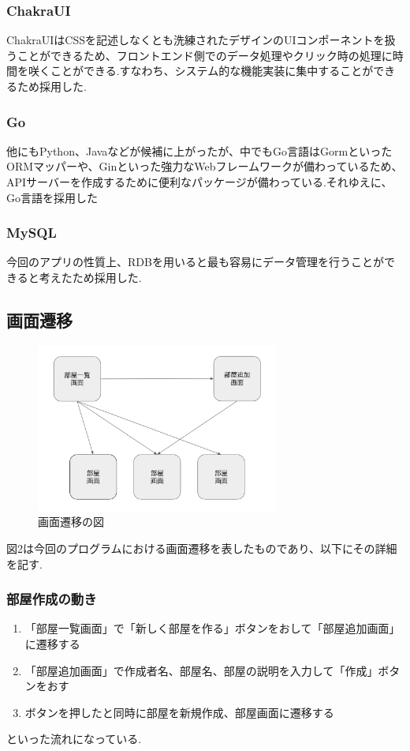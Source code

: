 \documentclass[submit,techrep]{ipsj}
\begin{document}
\subsubsection{ChakraUI}
ChakraUIはCSSを記述しなくとも洗練されたデザインのUIコンポーネントを扱うことができるため、フロントエンド側でのデータ処理やクリック時の処理に時間を咲くことができる.すなわち、システム的な機能実装に集中することができるため採用した.

\subsubsection{Go}
他にもPython、Javaなどが候補に上がったが、中でもGo言語はGormといったORMマッパーや、Ginといった強力なWebフレームワークが備わっているため、APIサーバーを作成するために便利なパッケージが備わっている.それゆえに、Go言語を採用した

\subsubsection{MySQL}
今回のアプリの性質上、RDBを用いると最も容易にデータ管理を行うことができると考えたため採用した.



\subsection{画面遷移}

\begin{figure}[htbp]
  \centering
 \includegraphics[width=8cm]{./images/screen_transition.jpg}
  \caption{画面遷移の図}
  \label{fig:sample}
\end{figure}

図2は今回のプログラムにおける画面遷移を表したものであり、以下にその詳細を記す.
\subsubsection{部屋作成の動き}
\begin{enumerate}
  \item 「部屋一覧画面」で「新しく部屋を作る」ボタンをおして「部屋追加画面」に遷移する
  \item 「部屋追加画面」で作成者名、部屋名、部屋の説明を入力して「作成」ボタンをおす
  \item  ボタンを押したと同時に部屋を新規作成、部屋画面に遷移する
 \end{enumerate}
といった流れになっている.
\end{document}
